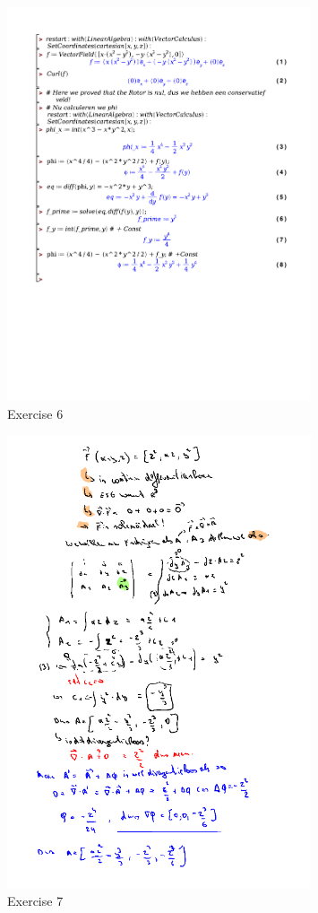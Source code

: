 \documentclass[a4paper]{article}
\begin{document}
\begin{figure}[H]
	\centering
	\includegraphics[width=0.8\textwidth]{exercises/huis_6_ex_6.pdf}
	\caption{Exercise 6}
	\label{fig:huis_6_ex_6_maple}
\end{figure}

\begin{figure}[H]
	\centering
	\includegraphics[width=0.8\textwidth]{assets/huis_6_ex_7.png}
	\caption{Exercise 7}
	\label{fig:huis_6_ex_7}
\end{figure}
\end{document}
